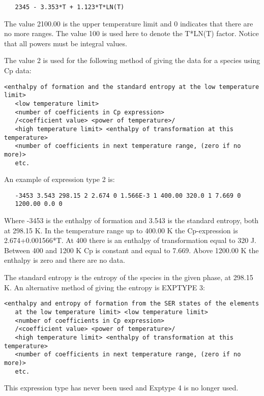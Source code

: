 \documentclass[12pt]{article}
\begin{document}
\begin{verbatim}
   2345 - 3.353*T + 1.123*T*LN(T)
\end{verbatim}

The value 2100.00 is the upper temperature limit and 0 indicates that
there are no more ranges. The value 100 is used here to denote the
T*LN(T) factor. Notice that all powers must be integral values.

The value 2 is used for the following method of giving the data for a
species using Cp data:

\begin{verbatim}
<enthalpy of formation and the standard entropy at the low temperature limit>
   <low temperature limit>
   <number of coefficients in Cp expression>
   /<coefficient value> <power of temperature>/
   <high temperature limit> <enthalpy of transformation at this temperature>
   <number of coefficients in next temperature range, (zero if no more)>
   etc.
\end{verbatim}

An example of expression type 2 is:

\begin{verbatim}
   -3453 3.543 298.15 2 2.674 0 1.566E-3 1 400.00 320.0 1 7.669 0
   1200.00 0.0 0
\end{verbatim}

Where -3453 is the enthalpy of formation and 3.543 is the standard
entropy, both at 298.15 K. In the temperature range up to 400.00 K the
Cp-expression is 2.674+0.001566*T. At 400 there is an enthalpy of
transformation equal to 320 J. Between 400 and 1200 K Cp is constant
and equal to 7.669. Above 1200.00 K the enthalpy is zero and there are
no data.

The standard entropy is the entropy of the species in the given phase, at
298.15 K. An alternative method of giving the entropy is EXPTYPE 3:

\begin{verbatim}
<enthalpy and entropy of formation from the SER states of the elements
   at the low temperature limit> <low temperature limit>
   <number of coefficients in Cp expression>
   /<coefficient value> <power of temperature>/
   <high temperature limit> <enthalpy of transformation at this temperature>
   <number of coefficients in next temperature range, (zero if no more)>
   etc.
\end{verbatim}

This expression type has never been used and Exptype 4 is no longer
used.
\end{document}

